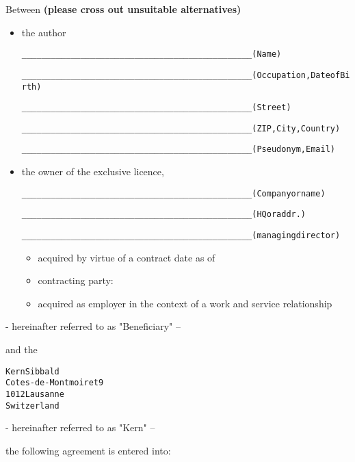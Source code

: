 Between 
{\bf (please cross out unsuitable alternatives)}\\
\begin{itemize}
\item the author
\begin{alltt}
_______________________________________________ (Name)

_______________________________________________ (Occupation, Date of Birth)

_______________________________________________ (Street)

_______________________________________________ (ZIP, City, Country)

_______________________________________________ (Pseudonym, Email)
\end{alltt}
\item the owner of the exclusive licence,
\begin{alltt}
_______________________________________________ (Company or name)

_______________________________________________ (HQ or addr.)

_______________________________________________ (managing director)
\end{alltt}
\begin{itemize}
\item acquired by virtue of a contract date as of
\item contracting party:
\item acquired as employer in the context of a work and service
  relationship
\end{itemize}
\end{itemize}
\begin{flushright}
- hereinafter referred to as "Beneficiary" --
\end{flushright}
and the
\begin{alltt}
    Kern Sibbald
    Cotes-de-Montmoiret 9
    1012 Lausanne
    Switzerland
\end{alltt}
\begin{flushright}
- hereinafter referred to as "Kern" --
\end{flushright}
the following agreement is entered into:\\

